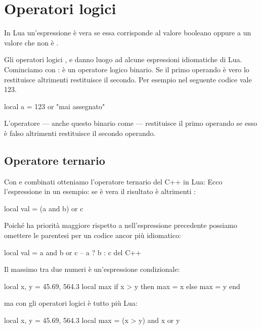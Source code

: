 

\chapter{Operatori logici}

In Lua un'espressione è vera se essa corrisponde al valore booleano
 oppure a un valore che non è .

Gli operatori logici ,  e
 danno luogo ad alcune espressioni idiomatiche di Lua.
Cominciamo con : è un operatore logico binario. Se il primo operando è
vero lo restituisce altrimenti restituisce il secondo. Per esempio nel seguente
codice  vale 123.
\begin{lines}
local a = 123 or "mai assegnato"
\end{lines}

L'operatore  --- anche questo binario come  --- restituisce il
primo operando se esso è falso altrimenti restituisce il secondo operando.

\section{Operatore ternario}
\label{secFondOperatoreTernario}

Con  e  combinati otteniamo l'operatore ternario del C++ in
Lua: Ecco l'espressione in un esempio: se  è vera il risultato è 
altrimenti :
\begin{lines}
local val = (a and b) or c
\end{lines}

Poiché  ha priorità maggiore rispetto a  nell'espressione
precedente possiamo omettere le parentesi per un codice ancor più idiomatico:
\begin{lines}
local val = a and b or c -- a ? b : c del C++
\end{lines}

Il massimo tra due numeri è un'espressione condizionale:
\begin{lines}
local x, y = 45.69, 564.3
local max
if x > y then
    max = x
else
    max = y
end
\end{lines}
ma con gli operatori logici è tutto più Lua:
\begin{lines}
local x, y = 45.69, 564.3
local max = (x > y) and x or y
\end{lines}

